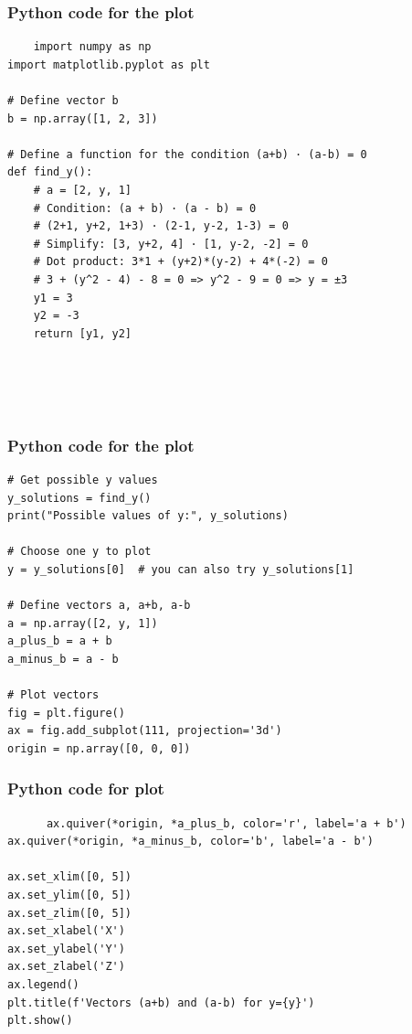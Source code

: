 \documentclass{beamer}
\begin{document}
\begin{frame}[fragile]
     \frametitle{Python code for the plot}
\begin{lstlisting}
    import numpy as np
import matplotlib.pyplot as plt

# Define vector b
b = np.array([1, 2, 3])

# Define a function for the condition (a+b) · (a-b) = 0
def find_y():
    # a = [2, y, 1]
    # Condition: (a + b) · (a - b) = 0
    # (2+1, y+2, 1+3) · (2-1, y-2, 1-3) = 0
    # Simplify: [3, y+2, 4] · [1, y-2, -2] = 0
    # Dot product: 3*1 + (y+2)*(y-2) + 4*(-2) = 0
    # 3 + (y^2 - 4) - 8 = 0 => y^2 - 9 = 0 => y = ±3
    y1 = 3
    y2 = -3
    return [y1, y2]





\end{lstlisting}
\end{frame}
\begin{frame}[fragile]
   \frametitle{Python code for the plot}
    \begin{lstlisting}
# Get possible y values
y_solutions = find_y()
print("Possible values of y:", y_solutions)

# Choose one y to plot
y = y_solutions[0]  # you can also try y_solutions[1]

# Define vectors a, a+b, a-b
a = np.array([2, y, 1])
a_plus_b = a + b
a_minus_b = a - b

# Plot vectors
fig = plt.figure()
ax = fig.add_subplot(111, projection='3d')
origin = np.array([0, 0, 0])
 \end{lstlisting}
\end{frame}
 \begin{frame}[fragile]
       \frametitle{Python code for plot}
       \begin{lstlisting}
      ax.quiver(*origin, *a_plus_b, color='r', label='a + b')
ax.quiver(*origin, *a_minus_b, color='b', label='a - b')

ax.set_xlim([0, 5])
ax.set_ylim([0, 5])
ax.set_zlim([0, 5])
ax.set_xlabel('X')
ax.set_ylabel('Y')
ax.set_zlabel('Z')
ax.legend()
plt.title(f'Vectors (a+b) and (a-b) for y={y}')
plt.show()
    \end{lstlisting}
 \end{frame}
\end{document}
